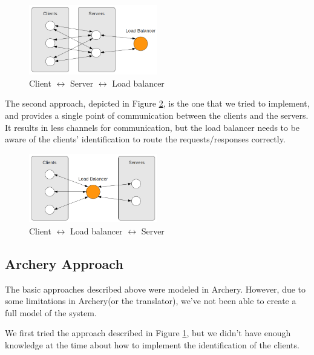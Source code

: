 \documentclass[a4paper]{article}
\newcommand{\ar}{Archery\xspace}
\begin{document}
\begin{figure}[htb]
	\begin{center}
		\includegraphics[width=0.5\textwidth]{images/c_s_lb.png}
	\end{center}
	\caption{Client $\leftrightarrow$ Server $\leftrightarrow$ Load balancer }
	\label{fig:cslb}
\end{figure}

The second approach, depicted in Figure \ref{fig:clbs}, is the one that we
tried to implement, and provides a single point of communication between the
clients and the servers. It results in less channels for communication, but the
load balancer needs to be aware of the clients' identification to route the
requests/responses correctly.

\begin{figure}[htb]
	\begin{center}
		\includegraphics[width=0.5\textwidth]{images/c_lb_s.png}
	\end{center}
	\caption{Client $\leftrightarrow$ Load balancer  $\leftrightarrow$ Server }
	\label{fig:clbs}
\end{figure}


\subsection{\ar Approach}

The basic approaches described above were modeled in \ar. However, due to some
limitations in \ar (or the translator), we've not been able to create a full
model of the system.

We first tried the approach described in Figure \ref{fig:cslb}, but we didn't
have
enough knowledge at the time about how to implement the identification of the
clients.
\end{document}
